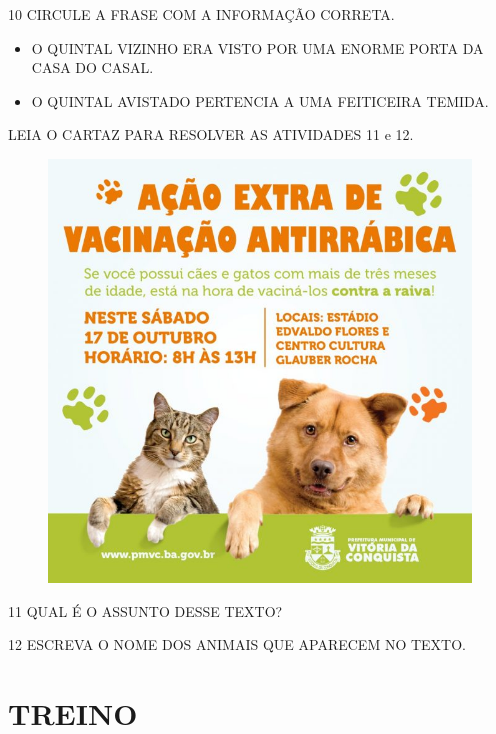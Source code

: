 \num{10} CIRCULE A FRASE COM A INFORMAÇÃO CORRETA.

\begin{itemize}

	\item O QUINTAL VIZINHO ERA VISTO POR UMA ENORME PORTA DA CASA DO CASAL.

	\item O QUINTAL AVISTADO PERTENCIA A UMA FEITICEIRA TEMIDA. 
\end{itemize}

LEIA O CARTAZ PARA RESOLVER AS ATIVIDADES 11 e 12.

\begin{figure}[H]
\centering
\includegraphics[width=.9\textwidth]{media/image165.jpeg}
\end{figure}

\num{11} QUAL É O ASSUNTO DESSE TEXTO?


\num{12} ESCREVA O NOME DOS ANIMAIS QUE APARECEM NO TEXTO.


\section*{TREINO}

